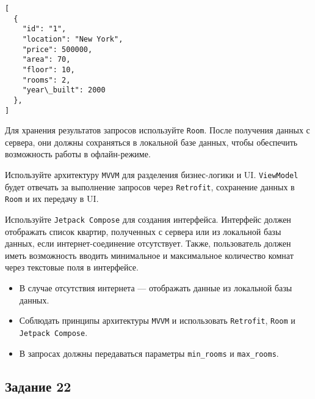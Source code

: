 \documentclass[a4paper,12pt]{article}
\begin{document}
\begin{verbatim}
[
  {
    "id": "1",
    "location": "New York",
    "price": 500000,
    "area": 70,
    "floor": 10,
    "rooms": 2,
    "year\_built": 2000
  },
]
\end{verbatim}

Для хранения результатов запросов используйте \texttt{Room}. 
После получения данных с сервера, они должны сохраняться в локальной базе данных, 
чтобы обеспечить возможность работы в офлайн-режиме. 

Используйте архитектуру \texttt{MVVM} для разделения бизнес-логики и UI. \texttt{ViewModel} будет отвечать за выполнение запросов через \texttt{Retrofit}, сохранение данных в \texttt{Room} и их передачу в UI.

Используйте \texttt{Jetpack Compose} для создания интерфейса. Интерфейс должен отображать список квартир, полученных с сервера или из локальной базы данных, если интернет-соединение отсутствует. Также, пользователь должен иметь возможность вводить минимальное и максимальное количество комнат через текстовые поля в интерфейсе.

\begin{itemize}
  \item В случае отсутствия интернета — отображать данные из локальной базы данных.
  \item Соблюдать принципы архитектуры \texttt{MVVM} и использовать \texttt{Retrofit}, \texttt{Room} и \texttt{Jetpack Compose}.
  \item В запросах должны передаваться параметры \texttt{min\_rooms} и \texttt{max\_rooms}.
\end{itemize}

\subsection*{Задание 22}
\end{document}
